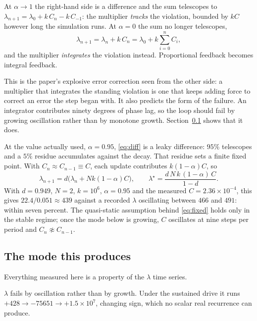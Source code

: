 \documentclass[11pt,a4paper]{article}
\begin{document}
At $\alpha \to 1$ the right-hand side is a difference and the sum telescopes to
$\lambda_{n+1} = \lambda_0 + k\,C_n - k\,C_{-1}$: the multiplier \emph{tracks} the violation,
bounded by $kC$ however long the simulation runs. At $\alpha = 0$ the sum no longer telescopes,
\begin{equation}
  \lambda_{n+1} = \lambda_n + k\,C_n = \lambda_0 + k\sum_{i=0}^{n} C_i ,
\end{equation}
and the multiplier \emph{integrates} the violation instead. Proportional feedback becomes
integral feedback.

This is the paper's explosive error correction seen from the other side: a multiplier that
integrates the standing violation is one that keeps adding force to correct an error the step
began with. It also predicts the form of the failure. An integrator contributes ninety degrees
of phase lag, so the loop should fail by growing oscillation rather than by monotone growth.
Section~\ref{sec:mode} shows that it does.

At the value actually used, $\alpha = 0.95$, \eqref{eq:diff} is a leaky difference: $95\%$
telescopes and a $5\%$ residue accumulates against the decay. That residue sets a finite fixed
point. With $C_n \approx C_{n-1} \equiv C$, each update contributes $k(1-\alpha)C$, so
\begin{equation}
  \lambda_{n+1} = d\big(\lambda_n + N k (1-\alpha) C\big),
  \qquad
  \lambda^\star = \frac{d\,N\,k\,(1-\alpha)\,C}{1-d} .
  \label{eq:fixed}
\end{equation}
With $d = 0.949$, $N = 2$, $k = 10^{6}$, $\alpha = 0.95$ and the measured
$C = 2.36\times10^{-4}$, this gives $22.4/0.051 \approx 439$ against a recorded $\lambda$
oscillating between $466$ and $491$: within seven percent. The quasi-static assumption behind
\eqref{eq:fixed} holds only in the stable regime; once the mode below is growing, $C$ oscillates
at nine steps per period and $C_n \not\approx C_{n-1}$.

\subsection{The mode this produces}
\label{sec:mode}

Everything measured here is a property of the $\lambda$ time series.

$\lambda$ fails by oscillation rather than by growth. Under the sustained drive it runs
$+428 \to -75651 \to +1.5\times10^{7}$, changing sign, which no scalar real recurrence can
produce.
\end{document}
